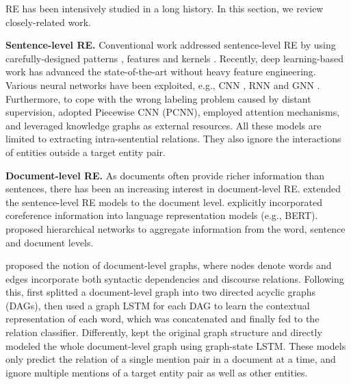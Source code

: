 \documentclass[11pt,a4paper]{article}
\begin{document}
RE has been intensively studied in a long history. In this section, we review closely-related work.

\smallskip
\noindent\textbf{Sentence-level RE.} Conventional work addressed sentence-level RE by using carefully-designed patterns \cite{soderland1995crystal}, features \cite{kambhatla2004combining} and kernels \cite{culotta2004dependency}. Recently, deep learning-based work has advanced the state-of-the-art without heavy feature engineering. Various neural networks have been exploited, e.g., CNN \cite{zeng2014relation}, RNN \cite{zhang2015bidirectional,cai2016bidirectional} and GNN \cite{zhang2018graph}. Furthermore, to cope with the wrong labeling problem caused by distant supervision, \citet{zeng2015distant} adopted Piecewise CNN (PCNN), \citet{lin2016neural,zhang2017position} employed attention mechanisms, and \citet{zhang2019long,qu2019a} leveraged knowledge graphs as external resources. All these models are limited to extracting intra-sentential relations. They also ignore the interactions of entities outside a target entity pair.

\smallskip
\noindent\textbf{Document-level RE.} As documents often provide richer information than sentences, there has been an increasing interest in document-level RE. \citet{gu2017chemical,nguyen2018convolutional,gupta2019neural,wang2019fine} extended the sentence-level RE models to the document level. \citet{ye2020coreferential} explicitly incorporated coreference information into language representation models (e.g., BERT).  \citet{zheng2018effective,tang2020hin} proposed hierarchical networks to aggregate information from the word, sentence and document levels.


\citet{quirk2017distant} proposed the notion of document-level graphs, where nodes denote words and edges incorporate both syntactic dependencies and discourse relations. Following this, \citet{peng2017cross} first splitted a document-level graph into two directed acyclic graphs (DAGs), then used a graph LSTM for each DAG to learn the contextual representation of each word, which was concatenated and finally fed to the relation classifier. Differently, \citet{song2018nary} kept the original graph structure and directly modeled the whole document-level graph using graph-state LSTM. These models only predict the relation of a single mention pair in a document at a time, and ignore multiple mentions of a target entity pair as well as other entities.
\end{document}

